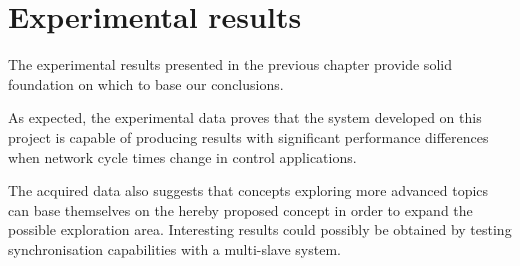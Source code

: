 \section{Experimental results} \label{sec:exp-results}
The experimental results presented in the previous chapter provide solid foundation on which to base our conclusions.

As expected, the experimental data proves that the system developed on this project is capable of producing results with significant performance differences when network cycle times change in control applications.

The acquired data also suggests that concepts exploring more advanced topics can base themselves on the hereby proposed concept in order to expand the possible exploration area.
Interesting results could possibly be obtained by testing synchronisation capabilities with a multi-slave system.
